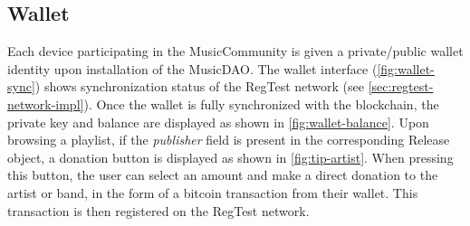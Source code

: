 \subsection{Wallet}
Each device participating in the MusicCommunity is given a private/public wallet identity upon installation of the MusicDAO. The wallet interface (\ref{fig:wallet-sync}) shows synchronization status of the RegTest network (see \ref{sec:regtest-network-impl}). Once the wallet is fully synchronized with the blockchain, the private key and balance are displayed as shown in \ref{fig:wallet-balance}. Upon browsing a playlist, if the \textit{publisher} field is present in the corresponding Release object, a donation button is displayed as shown in \ref{fig:tip-artist}. When pressing this button, the user can select an amount and make a direct donation to the artist or band, in the form of a bitcoin transaction from their wallet. This transaction is then registered on the RegTest network.
